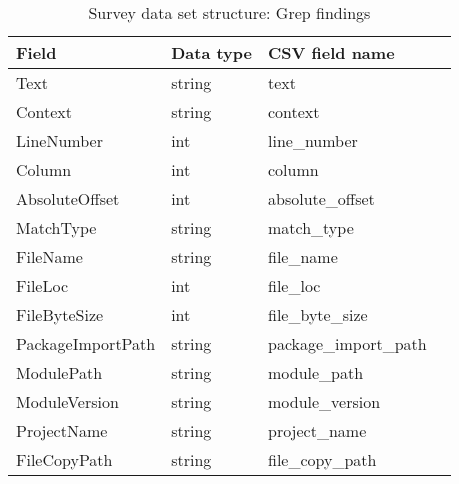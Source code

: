         \begin{table}[h]
            \centering
            \caption{Survey data set structure: Grep findings}
            \label{tbl:datastructure-grep-findings}
            \begin{tabular}{llll}
                \toprule
                Field & Data type & CSV field name \\
                \midrule
                Text                 & string & text \\
                Context              & string & context \\
                LineNumber           & int    & line\_number \\
                Column               & int    & column \\
                AbsoluteOffset       & int    & absolute\_offset \\
                MatchType            & string & match\_type \\
                FileName             & string & file\_name \\
                FileLoc              & int    & file\_loc \\
                FileByteSize         & int    & file\_byte\_size \\
                PackageImportPath    & string & package\_import\_path \\
                ModulePath           & string & module\_path \\
                ModuleVersion        & string & module\_version \\
                ProjectName          & string & project\_name \\
                FileCopyPath         & string & file\_copy\_path \\
                \bottomrule
            \end{tabular}
        \end{table}

